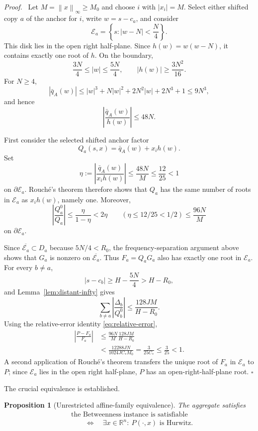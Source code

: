 \documentclass[final,5p,times,twocolumn]{elsarticle}
\newcommand{\R}{\mathbb R}
\newcommand{\abs}[1]{\left|#1\right|}
\newcommand{\norm}[1]{\left\|#1\right\|}
\newtheorem{proposition}[theorem]{Proposition}
\newenvironment{proof}[1][Proof]
  {\par\smallskip\noindent\textit{#1.}\ }
  {\hfill$\square$\par\smallskip}
\begin{document}
\begin{proof}
Let $M=\norm{x}_\infty\ge M_0$ and choose $i$ with $|x_i|=M$. Select either shifted copy $a$ of the anchor for $i$, write $w=s-c_a$, and consider
\[
\mathcal E_a=\left\{s:\abs{w-N}<\frac N4\right\}.
\]
This disk lies in the open right half-plane. Since $h(w)=w(w-N)$, it contains exactly one root of $h$. On the boundary,
\[
\frac{3N}{4}\le|w|\le\frac{5N}{4},
\qquad
|h(w)|\ge\frac{3N^2}{16}.
\]
For $N\ge4$,
\[
|\bar q_A(w)|
\le |w|^3+N|w|^2+2N^2|w|+2N^3+1
\le9N^3,
\]
and hence
\begin{equation}\label{eq:escape-local-ratio}
\abs{\frac{\bar q_A(w)}{h(w)}}\le48N.
\end{equation}

First consider the selected shifted anchor factor
\[
Q_a(s,x)=\bar q_A(w)+x_i h(w).
\]
Set
\[
\eta:=\abs{\frac{\bar q_A(w)}{x_i h(w)}}
\le\frac{48N}{M}
\le\frac{12}{25}<1
\]
on $\partial\mathcal E_a$. Rouch\'e's theorem therefore shows that $Q_a$ has the same number of roots in $\mathcal E_a$ as $x_i h(w)$, namely one. Moreover,
\[
\abs{\frac{Q_a^0}{Q_a}}
\le\frac{\eta}{1-\eta}
<2\eta\qquad(\eta\le12/25<1/2)
\le\frac{96N}{M}
\]
on $\partial\mathcal E_a$.

Since $\overline{\mathcal E_a}\subset D_a$ because $5N/4<R_0$, the frequency-separation argument above shows that $G_a$ is nonzero on $\overline{\mathcal E_a}$. Thus $F_a=Q_aG_a$ also has exactly one root in $\mathcal E_a$. For every $b\ne a$,
\[
|s-c_b|\ge H-\frac{5N}{4}>H-R_0,
\]
and Lemma~\ref{lem:distant-infty} gives
\[
\sum_{b\ne a}
\abs{\frac{\Delta_b}{Q_b^0}}
\le\frac{128JM}{H-R_0}.
\]
Using the relative-error identity \eqref{eq:relative-error},
\[
\begin{aligned}
\abs{\frac{P-F_a}{F_a}}
&\le\frac{96N}{M}\frac{128JM}{H-R_0}\\
&<\frac{12288JN}{1024JC_*M_0}
 =\frac{3}{25C_*}
 \le\frac3{25}<1.
\end{aligned}
\]
 A second application of Rouch\'e's theorem transfers the unique root of $F_a$ in $\mathcal E_a$ to $P$; since $\mathcal E_a$ lies in the open right half-plane, $P$ has an open-right-half-plane root.
\end{proof}

The crucial equivalence is established.
\begin{proposition}[Unrestricted affine-family equivalence]\label{prop:one-poly}
The aggregate satisfies
\[
\begin{aligned}
&\text{the Betweenness instance is satisfiable}\\
&\qquad\Longleftrightarrow\quad
\exists x\in\R^n:\ P(\cdot,x)\text{ is Hurwitz}.
\end{aligned}
\]
\end{proposition}
\end{document}
